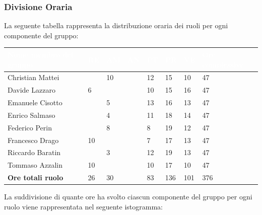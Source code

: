 \subsubsection{Divisione Oraria}
La seguente tabella rappresenta la distribuzione oraria dei ruoli per ogni componente del gruppo:
{
	\renewcommand{\arraystretch}{2}
	\begin{table}[h]
	\caption{Tabella della divisione oraria della Progettazione di Dettaglio e Codifica}
	
\begin{longtable}{ C{5cm} C{1cm} C{1cm} C{1cm} C{1cm} C{1cm} C{1cm} C{3cm}}
	\textcolor{white}{\textbf{Nome membro del gruppo}} & 
	\textcolor{white}{\textbf{RE}} & 
	\textcolor{white}{\textbf{AM}} & 
	\textcolor{white}{\textbf{AN}} & 
	\textcolor{white}{\textbf{PT}} & 
	\textcolor{white}{\textbf{PR}} & 
	\textcolor{white}{\textbf{VE}} & 
	\textcolor{white}{\textbf{Ore complessive}}\\
\endhead	
        
        Christian Mattei & & 10 & & 12 & 15 & 10 & 47\\
        Davide Lazzaro & 6 & & & 10 & 15 & 16 & 47\\
        Emanuele Cisotto & & 5 & & 13 & 16 & 13 & 47 \\
        Enrico Salmaso & & 4 & & 11 & 18 & 14 & 47\\
        Federico Perin & & 8 & & 8 & 19 & 12 & 47\\
        Francesco Drago & 10 & & & 7 & 17 & 13 & 47\\
        Riccardo Baratin & & 3 & & 12 & 19 & 13 & 47\\
        Tommaso Azzalin & 10 & & & 10 & 17 & 10 & 47 \\
        \textbf{Ore totali ruolo} & 26 & 30 & & 83 & 136 & 101 & 376\\
		
	\end{longtable}
\end{table}
}
\newline
La suddivisione di quante ore ha svolto ciascun componente del gruppo per ogni ruolo viene rappresentata nel seguente istogramma:



